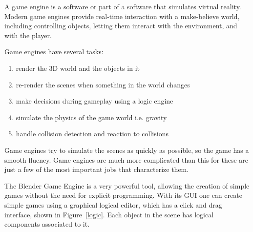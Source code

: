 A game engine is a software or part of a software that simulates virtual reality\cite{bookGameKit2}. Modern game engines provide real-time interaction with a make-believe world, including controlling objects, letting them interact with the environment, and with the player. 

Game engines have several tasks:
\begin{enumerate}
\item{render the 3D world and the objects in it}
\item{re-render the scenes when something in the world changes}
\item{make decisions during gameplay using a logic engine}
\item{simulate the physics of the game world i.e. gravity}
\item{handle collision detection and reaction to collisions}
\end{enumerate}

Game engines try to simulate the scenes as quickly as possible, so the game has a smooth fluency. Game engines are much more complicated than this for these are just a few of the most important jobs that characterize them.

The Blender Game Engine is a very powerful tool, allowing the creation of simple games without  the need for explicit programming. With its GUI one can create simple games using a graphical logical editor, which has a click and drag interface, shown in Figure~\ref{logic}. Each object in the scene has logical components associated to it. 

